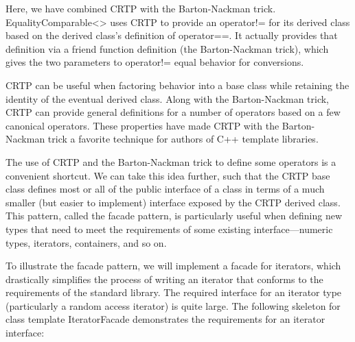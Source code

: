 Here, we have combined CRTP with the Barton-Nackman trick. EqualityComparable<> uses CRTP to provide an operator!= for its derived class based on the derived class’s definition of operator==. It actually provides that definition via a friend function definition (the Barton-Nackman trick), which gives the two parameters to operator!= equal behavior for conversions.

CRTP can be useful when factoring behavior into a base class while retaining the identity of the eventual derived class. Along with the Barton-Nackman trick, CRTP can provide general definitions for a number of operators based on a few canonical operators. These properties have made CRTP with the Barton-Nackman trick a favorite technique for authors of C++ template libraries.


The use of CRTP and the Barton-Nackman trick to define some operators is a convenient shortcut. We can take this idea further, such that the CRTP base class defines most or all of the public interface of a class in terms of a much smaller (but easier to implement) interface exposed by the CRTP derived class. This pattern, called the facade pattern, is particularly useful when defining new types that need to meet the requirements of some existing interface—numeric types, iterators, containers, and so on.

To illustrate the facade pattern, we will implement a facade for iterators, which drastically simplifies the process of writing an iterator that conforms to the requirements of the standard library. The required interface for an iterator type (particularly a random access iterator) is quite large. The following skeleton for class template IteratorFacade demonstrates the requirements for an iterator interface:

